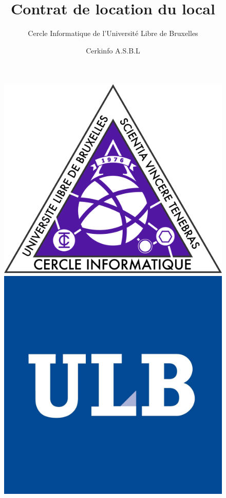 \documentclass{article}
\title{Contrat de location du local}
\author{Cercle Informatique de l'Université Libre de Bruxelles}
\date{Cerkinfo A.S.B.L}
\begin{document}
\begin{figure}
	\includegraphics[scale=0.03]{images/ci.png}
	\hfill
	\includegraphics[scale=0.4]{images/ulb.png}
  \label{fig:ci}
\end{figure}

\maketitle
\end{document}
